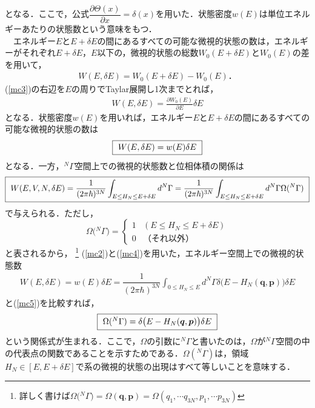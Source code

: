 となる．ここで，公式$\dfrac{\partial \Theta(x)}{\partial x}=\delta(x)$を用いた．状態密度$w(E)$は単位エネルギーあたりの状態数という意味をもつ．\\
　エネルギー$E$と$E+\delta E$の間にあるすべての可能な微視的状態の数は，エネルギーがそれぞれ$E+\delta E$，$E$以下の，微視的状態の総数$W_0(E+\delta E)$と$W_0(E)$の差を用いて，
\begin{align}
\label{mc3}
W(E,\delta E)=W_0(E+\delta E)-W_0(E)．
\end{align}
(\ref{mc3})の右辺を$E$の周りでTaylar展開し1次までとれば，
\begin{align}
W(E,\delta E)=\frac{\partial W_0(E)}{\partial E}\delta E
\end{align}
となる．状態密度$w(E)$を用いれば，エネルギー$E$と$E+\delta E$の間にあるすべての可能な微視的状態の数は
\begin{align}
\label{mc4}
\fbox{
$W(E,\delta E)=w(E)\delta E$
}
\end{align}
となる．一方，${}^N\Gamma$空間上での微視的状態数と位相体積の関係は
\begin{align}
\label{mc5}
\fbox{
$W(E,V,N,\delta E)=\dfrac{1}{(2\pi\hbar)^{3N}}\displaystyle\int_{E\leq H_N\leq E+\delta E}d^N\Gamma
=\dfrac{1}{(2\pi\hbar)^{3N}}\displaystyle\int_{E\leq H_N\leq E+\delta E}d^N\Gamma\Omega({}^N\Gamma)$
}
\end{align}
で与えられる．ただし，
　\begin{equation}\label{o1}
\Omega\bigl({}^N\Gamma\bigr)
  = \begin{cases}
      1  & (E\leq H_N\leq E+\delta E)\\[15pt]
      0 & （\text{それ以外}）
    \end{cases}
\end{equation}
と表されるから，
\footnote{
詳しく書けば$\Omega\bigl({}^N\Gamma\bigr)=\Omega(\bm{q},\bm{p})=\Omega(q_1,\cdots q_{3N},p_1,\cdots p_{3N})$
}
(\ref{mc2})と(\ref{mc4})を用いた，エネルギー空間上での微視的状態数
\begin{align}
\label{mc6}
W(E,\delta E)=w(E)\delta E=\dfrac{1}{(2\pi\hbar)^{3N}}\int_{0\leq H_N\leq E}d^N\Gamma
\delta\bigl(E-H_N(\bm{q},\bm{p})\bigr)\delta E
\end{align}
と(\ref{mc5})を比較すれば，
\begin{align}
\label{mc7}
\fbox{
$\Omega({}^N\Gamma)=\delta\bigl(E-H_N(\bm{q},\bm{p})\bigr)\delta E$
}
\end{align}
という関係式が生まれる．ここで，$\Omega$の引数に${}^N\Gamma$と書いたのは，$\Omega$が${}^N\Gamma$空間の中の代表点の関数であることを示すためである．$\Omega({}^N\Gamma)$は，領域$H_N\in[E,E+\delta E]$で系の微視的状態の出現はすべて等しいことを意味する．\\
